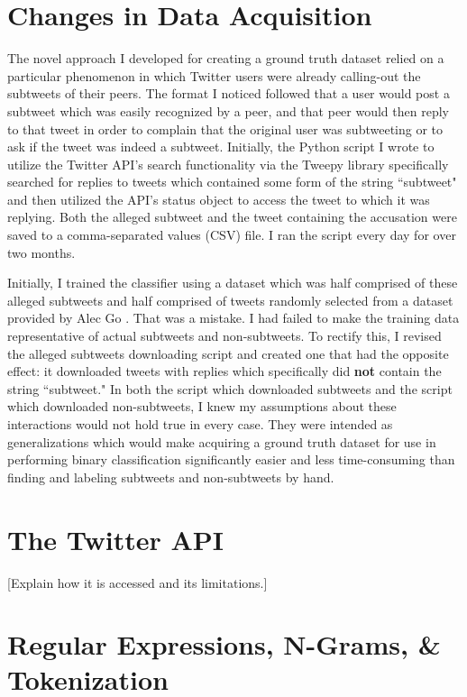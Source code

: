 \documentclass[11pt, twoside, reqno]{book}
\begin{document}
\section{Changes in Data Acquisition}
\label{changes_in_data}

The novel approach I developed for creating a ground truth dataset relied on a particular phenomenon in which Twitter users were already calling-out the subtweets of their peers. The format I noticed followed that a user would post a subtweet which was easily recognized by a peer, and that peer would then reply to that tweet in order to complain that the original user was subtweeting or to ask if the tweet was indeed a subtweet. Initially, the Python script I wrote to utilize the Twitter API's search functionality via the Tweepy library specifically searched for replies to tweets which contained some form of the string ``subtweet" and then utilized the API's status object to access the tweet to which it was replying. Both the alleged subtweet and the tweet containing the accusation were saved to a comma-separated values (CSV) file. I ran the script every day for over two months.

Initially, I trained the classifier using a dataset which was half comprised of these alleged subtweets and half comprised of tweets randomly selected from a dataset provided by Alec Go \cite{go_dataset}. That was a mistake. I had failed to make the training data representative of actual subtweets and non-subtweets. To rectify this, I revised the alleged subtweets downloading script and created one that had the opposite effect: it downloaded tweets with replies which specifically did \textbf{not} contain the string ``subtweet." In both the script which downloaded subtweets and the script which downloaded non-subtweets, I knew my assumptions about these interactions would not hold true in every case. They were intended as generalizations which would make acquiring a ground truth dataset for use in performing binary classification significantly easier and less time-consuming than finding and labeling subtweets and non-subtweets by hand.

\section{The Twitter API}
\label{twitter_api}

[Explain how it is accessed and its limitations.]

\section{Regular Expressions, N-Grams, \& Tokenization}
\label{regular_expressions_etc}
\end{document}
